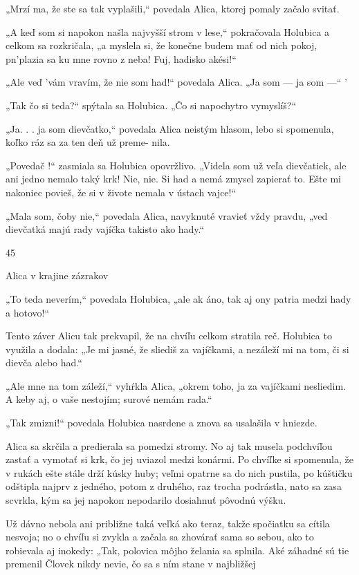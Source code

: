 \documentclass[12pt]{book}
\begin{document}
\begin{Parallel}[p]{}{}
{„Mrzí ma, že ste sa tak vyplašili,“ povedala Alica, ktorej
pomaly začalo svitať.

„A keď som si napokon našla najvyšší strom v lese,“
pokračovala Holubica a celkom sa rozkričala, „a myslela si,
že konečne budem mať od nich pokoj, pn'plazia sa ku mne
rovno z neba! Fuj, hadisko akési!“

„Ale veď 'vám vravím, že nie som had!“ povedala Alica.
„Ja som — ja som —“ '

„Tak čo si teda?“ spýtala sa Holubica. „Čo si napochytro
vymyslíš?“

„Ja. . . ja som dievčatko,“ povedala Alica neistým hlasom,
lebo si spomenula, koľko ráz sa za ten deň už preme-
nila.

„Povedač !“ zasmiala sa Holubica opovržlivo. „Videla
som už veľa dievčatiek, ale ani jedno nemalo taký krk! Nie,
nie. Si had a nemá zmysel zapierať to. Ešte mi nakoniec
povieš, že si v živote nemala v ústach vajce!“

„Mala som, čoby nie,“ povedala Alica, navyknuté vravieť
vždy pravdu, „ved dievčatká majú rady vajíčka takisto ako
hady.“

45

Alica v krajine zázrakov

„To teda neverím,“ povedala Holubica, „ale ak áno, tak
aj ony patria medzi hady a hotovo!“

Tento záver Alicu tak prekvapil, že na chvíľu celkom
stratila reč. Holubica to využila a dodala: „Je mi jasné, že
sliediš za vajíčkami, a nezáleží mi na tom, či si dievča alebo
had.“

„Ale mne na tom záleží,“ vyhŕkla Alica, „okrem toho, ja
za vajíčkami nesliedim. A keby aj, o vaše nestojím; surové
nemám rada.“

„Tak zmizni!“ povedala Holubica nasrdene a znova sa
usalašila v hniezde.

Alica sa skrčila a predierala sa pomedzi stromy. No aj tak
musela podchvíľou zastať a vymotať si krk, čo jej uviazol
medzi konármi. Po chvíľke si spomenula, že v rukách ešte
stále drží kúsky huby; veľmi opatrne sa do nich pustila, po
kúštičku odštipla najprv z jedného, potom z druhého, raz
trocha podrástla, nato sa zasa scvrkla, kým sa jej napokon
nepodarilo dosiahnuť pôvodnú výšku.

Už dávno nebola ani približne taká veľká ako teraz, takže
spočiatku sa cítila nesvoja; no o chvíľu si zvykla a začala sa
zhovárať sama so sebou, ako to robievala aj inokedy: „Tak,
polovica môjho želania sa splnila. Aké záhadné sú tie
premenil Človek   nikdy nevie, čo sa s ním stane v najbližšej

}
\end{Parallel}
\end{document}
